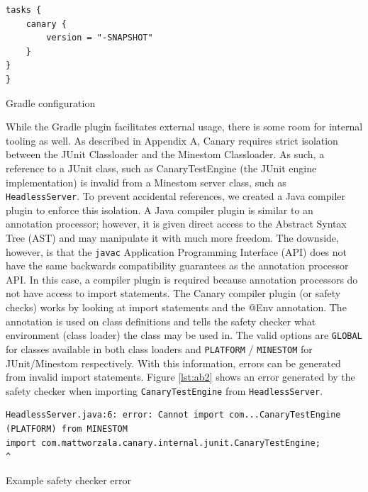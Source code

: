 \documentclass[12pt]{article}
\def\code#1{\texttt{#1}}
\begin{document}
\begin{onehalfspacing}
\begin{listing}[H]
\begin{verbatim}
tasks {
    canary {
        version = "-SNAPSHOT"
    }
}
}
\end{verbatim}
\caption{Gradle configuration}
\label{lst:ab1}
\end{listing}












While the Gradle plugin facilitates external usage, there is some room
for internal tooling as well. As described in Appendix A, Canary
requires strict isolation between the JUnit Classloader and the Minestom
Classloader. As such, a reference to a JUnit class, such as
CanaryTestEngine (the JUnit engine implementation) is invalid from a
Minestom server class, such as \code{HeadlessServer}. To prevent accidental
references, we created a Java compiler plugin to enforce this isolation.
A Java compiler plugin is similar to an annotation processor; however,
it is given direct access to the Abstract Syntax Tree (AST) and may
manipulate it with much more freedom. The downside, however, is that the
\code{javac} Application Programming Interface (API) does not have the same
backwards compatibility guarantees as the annotation processor API. In
this case, a compiler plugin is required because annotation processors
do not have access to import statements. The Canary compiler plugin (or
safety checks) works by looking at import statements and the @Env
annotation. The annotation is used on class definitions and tells the
safety checker what environment (class loader) the class may be used in.
The valid options are \code{GLOBAL} for classes available in both class loaders
and \code{PLATFORM} / \code{MINESTOM} for JUnit/Minestom respectively. With this
information, errors can be generated from invalid import statements.
Figure \ref{lst:ab2} shows an error generated by the safety checker when
importing \code{CanaryTestEngine} from \code{HeadlessServer}.

\begin{listing}[H]
\begin{verbatim}
HeadlessServer.java:6: error: Cannot import com...CanaryTestEngine (PLATFORM) from MINESTOM
import com.mattworzala.canary.internal.junit.CanaryTestEngine;
^
\end{verbatim}
\caption{Example safety checker error}
\label{lst:ab2}
\end{listing}


\end{onehalfspacing}
\end{document}
